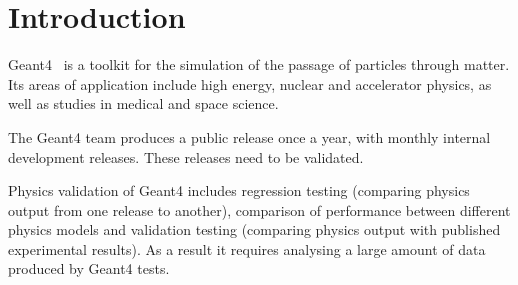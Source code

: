 \section{Introduction}
\label{sec-introduction}
Geant4~\cite{Geant4} is a toolkit for the simulation of the passage of particles through matter. Its areas of application include high energy, nuclear and accelerator physics, as well as studies in medical and space science.

The Geant4 team produces a public release once a year, with monthly internal development releases. These releases need to be validated.

Physics validation of Geant4 includes regression testing (comparing physics output from one release to another), comparison of performance between different physics models and validation testing (comparing physics output with published experimental results). As a result it requires analysing
a large amount of data produced by Geant4 tests.




